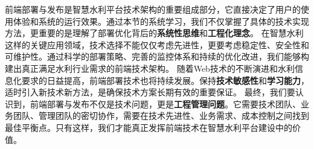 前端部署与发布是智慧水利平台技术架构的重要组成部分，它直接决定了用户的使用体验和系统的运行效果。通过本节的系统学习，我们不仅掌握了具体的技术实现方法，更重要的是理解了部署优化背后的\textbf{系统性思维}和\textbf{工程化理念}。
在智慧水利这样的关键应用领域，技术选择不能仅仅考虑先进性，更要考虑稳定性、安全性和可维护性。通过科学的部署策略、完善的监控体系和持续的优化改进，我们能够构建出真正满足水利行业需求的前端技术架构。
随着Web技术的不断演进和水利信息化要求的日益提高，前端部署技术也将持续发展。保持\textbf{技术敏感性}和\textbf{学习能力}，适时引入新技术新方法，是确保技术方案长期有效的重要保证。
最终，我们要认识到，前端部署与发布不仅是技术问题，更是\textbf{工程管理问题}。它需要技术团队、业务团队、管理团队的密切协作，需要在技术先进性、业务需求、成本控制之间找到最佳平衡点。只有这样，我们才能真正发挥前端技术在智慧水利平台建设中的价值。
